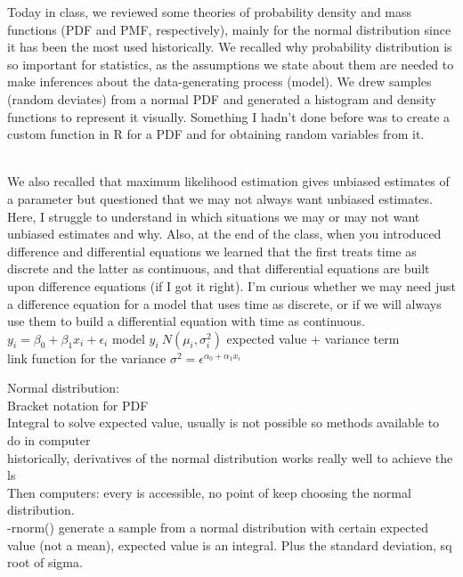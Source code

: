 \documentclass[
]{book}
\begin{document}
Today in class, we reviewed some theories of probability density and mass functions (PDF and PMF, respectively), mainly for the normal distribution since it has been the most used historically. We recalled why probability distribution is so important for statistics, as the assumptions we state about them are needed to make inferences about the data-generating process (model). We drew samples (random deviates) from a normal PDF and generated a histogram and density functions to represent it visually. Something I hadn't done before was to create a custom function in R for a PDF and for obtaining random variables from it.\\
\strut \\
We also recalled that maximum likelihood estimation gives unbiased estimates of a parameter but questioned that we may not always want unbiased estimates. Here, I struggle to understand in which situations we may or may not want unbiased estimates and why. Also, at the end of the class, when you introduced difference and differential equations we learned that the first treats time as discrete and the latter as continuous, and that differential equations are built upon difference equations (if I got it right). I'm curious whether we may need just a difference equation for a model that uses time as discrete, or if we will always use them to build a differential equation with time as continuous.\\

\(y_i = \beta_0 + \beta_1x_i+\epsilon_i\) model
\(y_i ~ N(\mu_i,\sigma^2_i)\) expected value + variance term\\

link function for the variance \(\sigma^2 = \epsilon^{\alpha_0+\alpha_1x_i}\)

Normal distribution:\\
Bracket notation for PDF\\
Integral to solve expected value, usually is not possible so methods available to do in computer\\
historically, derivatives of the normal distribution works really well to achieve the ls\\
Then computers: every is accessible, no point of keep choosing the normal distribution.\\
-rnorm() generate a sample from a normal distribution with certain expected value (not a mean), expected value is an integral. Plus the standard deviation, sq root of sigma.\\
\end{document}
